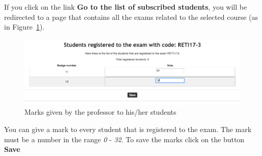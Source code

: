 If you click on the link \textbf{Go to the list of subscribed students}, you will be redirected to a page that contains all the exams related to the selected course (as in Figure~\ref{fig:professorExamsMarks}).
\begin{figure}[H]
	\centering
	\includegraphics[width=1.0\textwidth]{img/professorExamsMarks.png}
	\caption{Marks given by the professor to his/her students}
	\label{fig:professorExamsMarks}
\end{figure}

You can give a mark to every student that is registered to the exam. The mark must be a number in the range \emph{0} - \emph{32}. To save the marks click on the button \textbf{Save}